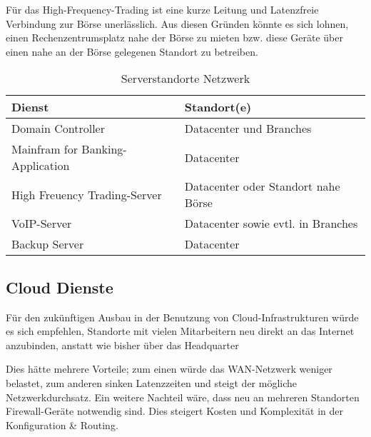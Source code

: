 Für das High-Frequency-Trading ist eine kurze Leitung und Latenzfreie Verbindung zur Börse unerlässlich. Aus diesen Gründen könnte es sich lohnen, einen Rechenzentrumsplatz nahe der Börse zu mieten bzw. diese Geräte über einen nahe an der Börse gelegenen Standort zu betreiben.

\begin{table}[h]
	\centering
	\begin{tabu} to \linewidth {l l}
		\toprule
		Dienst & Standort(e) \\
		\midrule
		Domain Controller & Datacenter und Branches \\
		Mainfram for Banking-Application & Datacenter \\
		High Freuency Trading-Server & Datacenter oder Standort nahe Börse \\
		VoIP-Server & Datacenter sowie evtl. in Branches\\
		Backup Server & Datacenter \\
		\bottomrule
	\end{tabu} 
	\label{tbl:server_standorte}
	\caption{Serverstandorte Netzwerk}
\end{table}

\subsection{Cloud Dienste}

Für den zukünftigen Ausbau in der Benutzung von Cloud-Infrastrukturen würde es sich empfehlen, Standorte mit vielen Mitarbeitern neu direkt an das Internet anzubinden, anstatt wie bisher über das Headquarter

Dies hätte mehrere Vorteile; zum einen würde das WAN-Netzwerk weniger belastet, zum anderen sinken Latenzzeiten und steigt der mögliche Netzwerkdurchsatz. Ein weitere Nachteil wäre, dass neu an mehreren Standorten Firewall-Geräte notwendig sind. Dies steigert Kosten und Komplexität in der Konfiguration \& Routing.



